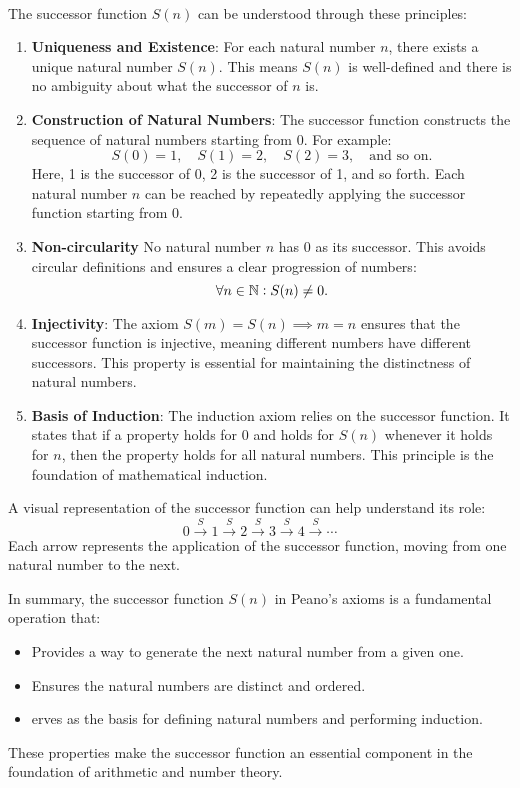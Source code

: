\begin{remark} \ \\
	The successor function $S(n)$ can be understood through these principles:
	\begin{enumerate}
		\item \textbf{Uniqueness and Existence}: For each natural number $n$, there exists a unique natural number $S(n)$. This means $S(n)$ is well-defined and there is no ambiguity about what the successor of $n$ is.
		\item \textbf{Construction of Natural Numbers}: The successor function constructs the sequence of natural numbers starting from 0. For example: \[
		S(0)=1,\quad S(1)=2,\quad S(2)=3,\quad\text{and so on}.
		\]
		Here, 1 is the successor of 0, 2 is the successor of 1, and so forth. Each natural number $n$ can be reached by repeatedly applying the successor function starting from 0.
		\item \textbf{Non-circularity} No natural number $n$ has $0$ as its successor. This avoids circular definitions and ensures a clear progression of numbers: \[
		\forall n\in\mathbb{N}:S(n)\neq 0.
		\]
		\item \textbf{Injectivity}:  The axiom $S(m)=S(n)\implies m=n$ ensures that the successor function is injective, meaning different numbers have different successors. This property is essential for maintaining the distinctness of natural numbers.
		\item \textbf{Basis of Induction}: The induction axiom relies on the successor function. It states that if a property holds for 0 and holds for $S(n)$ whenever it holds for $n$, then the property holds for all natural numbers. This principle is the foundation of mathematical induction.
	\end{enumerate}
	
	A  visual representation of the successor function can help understand its role: \[
	0\xrightarrow{S} 1\xrightarrow{S} 2\xrightarrow{S} 3\xrightarrow{S} 4\xrightarrow{S} \cdots
	\] Each arrow represents the application of the successor function, moving from one natural number to the next.
	
	In summary, the successor function $S(n)$ in Peano's axioms is a fundamental operation that:
	\begin{itemize}
		\item Provides a way to generate the next natural number from a given one.
		\item  Ensures the natural numbers are distinct and ordered.
		\item erves as the basis for defining natural numbers and performing induction.
	\end{itemize}
	These properties make the successor function an essential component in the foundation of arithmetic and number theory.
\end{remark}

